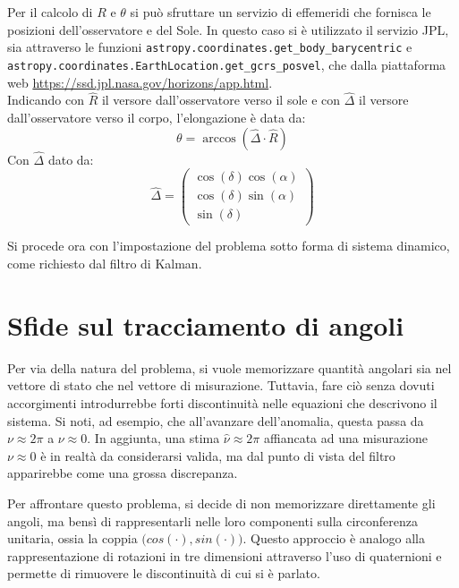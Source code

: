 \documentclass[12pt,a4paper,openright,twoside]{book}
\begin{document}
Per il calcolo di $R$ e $\theta$ si può sfruttare un servizio di effemeridi che fornisca le posizioni dell'osservatore e del Sole. In questo caso si è utilizzato il servizio JPL, sia attraverso le funzioni \lstinline{astropy.coordinates.get_body_barycentric} e \lstinline{astropy.coordinates.EarthLocation.get_gcrs_posvel}, che dalla piattaforma web \url{https://ssd.jpl.nasa.gov/horizons/app.html}. \\
Indicando con $\hat{R}$ il versore dall'osservatore verso il sole e con $\hat{\Delta}$ il versore dall'osservatore verso il corpo, l'elongazione è data da:
\begin{equation}
\theta=\arccos\left(\hat{\Delta}\cdot\hat{R}\right)
\end{equation}
Con $\hat{\Delta}$ dato da:
\begin{equation}\label{eq:radec2dir}
\hat{\Delta}=\begin{pmatrix}
\cos(\delta)\cos(\alpha) \\
\cos(\delta)\sin(\alpha) \\
\sin(\delta)
\end{pmatrix}
\end{equation}


Si procede ora con l'impostazione del problema sotto forma di sistema dinamico, come richiesto dal filtro di Kalman.

\section{Sfide sul tracciamento di angoli}\label{sec:angle-challenges}

Per via della natura del problema, si vuole memorizzare quantità angolari sia nel vettore di stato che nel vettore di misurazione. Tuttavia, fare ciò senza dovuti accorgimenti introdurrebbe forti discontinuità nelle equazioni che descrivono il sistema. Si noti, ad esempio, che all'avanzare dell'anomalia, questa passa da $\nu\approx2\pi$ a $\nu\approx0$. In aggiunta, una stima $\hat{\nu}\approx2\pi$ affiancata ad una misurazione $\nu\approx0$ è in realtà da considerarsi valida, ma dal punto di vista del filtro apparirebbe come una grossa discrepanza.

Per affrontare questo problema, si decide di non memorizzare direttamente gli angoli, ma bensì di rappresentarli nelle loro componenti sulla circonferenza unitaria, ossia la coppia $\bigl(cos(\cdot),sin(\cdot)\bigr)$. Questo approccio è analogo alla rappresentazione di rotazioni in tre dimensioni attraverso l'uso di quaternioni e permette di rimuovere le discontinuità di cui si è parlato.
\end{document}
